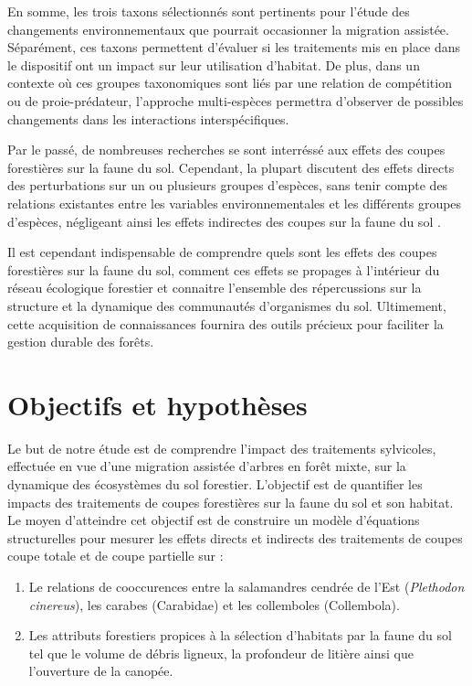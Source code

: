 En somme, les trois taxons sélectionnés sont pertinents pour l’étude des changements environnementaux que pourrait occasionner la migration assistée. 
Séparément, ces taxons permettent d’évaluer si les traitements mis en place dans le dispositif ont un impact sur leur utilisation d’habitat. 
De plus, dans un contexte où ces groupes taxonomiques sont liés par une relation de compétition ou de proie-prédateur, l’approche multi-espèces 
permettra d’observer de possibles changements dans les interactions interspécifiques.  

Par le passé, de nombreuses recherches se sont interréssé aux effets des coupes forestières sur la faune du sol. 
Cependant, la plupart discutent des effets directs des perturbations sur un ou plusieurs groupes d'espèces, 
sans tenir compte des relations existantes entre les variables environnementales et les différents groupes d'espèces, 
négligeant ainsi les effets indirectes des coupes sur la faune du sol \citep{josephIntegratingOccupancyModels2016,Kudrin2023metaanalysiseffects,Pollierer2021Diversityfunctional}. 

Il est cependant indispensable de comprendre quels sont les effets des coupes forestières sur la faune du sol, 
comment ces effets se propages à l'intérieur du réseau écologique forestier et connaitre l'ensemble des répercussions sur la structure 
et la dynamique des communautés d'organismes du sol. 
Ultimement, cette acquisition de connaissances fournira des outils précieux pour faciliter la gestion durable des forêts.


\section*{Objectifs et hypothèses}
\label{sec:objectifs}

Le but de notre étude est de comprendre l'impact des traitements sylvicoles, effectuée en vue d'une migration assistée d'arbres en forêt mixte, sur la dynamique des écosystèmes du sol forestier.
L'objectif est de quantifier les impacts des traitements de coupes forestières sur la faune du sol et son habitat. 
Le moyen d'atteindre cet objectif est de construire un modèle d'équations structurelles pour mesurer les effets directs et indirects des traitements de coupes coupe totale et de coupe partielle sur : 

\begin{enumerate}
    \item Le relations de cooccurences entre la salamandres cendrée de l'Est (\textit{Plethodon cinereus}), les carabes (Carabidae) et les collemboles (Collembola).
    \item Les attributs forestiers propices à la sélection d'habitats par la faune du sol tel que le volume de débris ligneux, la profondeur de litière ainsi que l'ouverture de la canopée. 
\end{enumerate}

